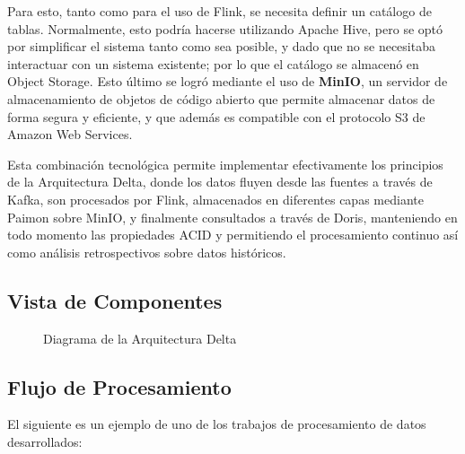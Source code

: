 Para esto, tanto como para el uso de Flink, se necesita definir un catálogo de tablas.
Normalmente, esto podría hacerse utilizando Apache Hive, pero se optó por simplificar el sistema tanto como sea posible, 
y dado que no se necesitaba interactuar con un sistema existente; por lo que el catálogo se almacenó en Object Storage.\newline
\newpage
Esto último se logró mediante el uso de \textbf{MinIO}, un servidor de almacenamiento de objetos de código abierto que
permite almacenar datos de forma segura y eficiente, y que además es compatible con el protocolo S3 de Amazon Web Services.\newline

Esta combinación tecnológica permite implementar efectivamente los principios de la Arquitectura Delta, 
donde los datos fluyen desde las fuentes a través de Kafka, son procesados por Flink, 
almacenados en diferentes capas mediante Paimon sobre MinIO, y finalmente consultados a través de Doris, 
manteniendo en todo momento las propiedades ACID 
y permitiendo el procesamiento continuo así como análisis retrospectivos sobre datos históricos.

\newpage
\subsection{Vista de Componentes}


\begin{figure}[h]
    \caption{Diagrama de la Arquitectura Delta}
    \label{fig:des_arquitectura_delta}
\end{figure}

\clearpage
\newpage

\subsection{Flujo de Procesamiento}

El siguiente es un ejemplo de uno de los trabajos de procesamiento de datos desarrollados:

